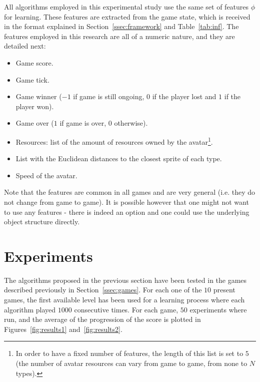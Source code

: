 \documentclass[conference]{IEEEtran}
\newenvironment{mitems}
{\begin{itemize}
\setlength{\itemsep}{1pt}
\setlength{\parskip}{0pt}
\setlength{\parsep}{0pt}}{\end{itemize}}
\begin{document}
All algorithms employed in this experimental study use the same set of features $\phi$ for learning. These features are extracted from the game state, which is received in the format explained in Section~\ref{ssec:framework} and Table~\ref{tab:inf}. The features employed in this research are all of a numeric nature, and they are detailed next:

\begin{mitems}
\item Game score.
\item Game tick.
\item Game winner ($-1$ if game is still ongoing, $0$ if the player lost and $1$ if the player won).
\item Game over ($1$ if game is over, $0$ otherwise).
\item Resources: list of the amount of resources owned by the avatar\footnote{In order to have a fixed number of features, the length of this list is set to $5$ (the number of avatar resources can vary from game to game, from none to $N$ types).}.
\item List with the Euclidean distances to the closest sprite of each type. 
\item Speed of the avatar.
\end{mitems}

Note that the features are common in all games and are very general (i.e. they do not change from game to game). It is possible however that one might not want to use any features - there is indeed an option and one could use the underlying object structure directly. 



\section{Experiments} \label{sec:exp}

The algorithms proposed in the previous section have been tested in the games described previously in Section~\ref{ssec:games}. For each one of the $10$ present games, the first available level has been used for a learning process where each algorithm played $1000$ consecutive times. For each game, $50$ experiments where run, and the average of the progression of the score is plotted in Figures~\ref{fig:results1} and~\ref{fig:results2}. 
\end{document}
